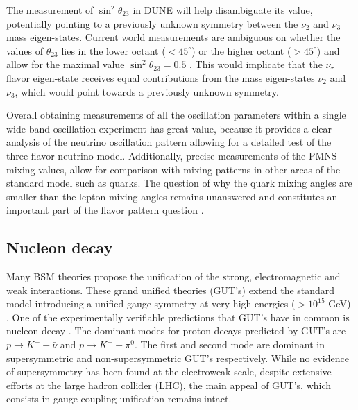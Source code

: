 The measurement of $\sin^2\theta_{23}$ in DUNE will help disambiguate its value, potentially pointing to a previously unknown symmetry between the $\nu_2$ and $\nu_3$ mass eigen-states.  Current world measurements are ambiguous on whether the values of $\theta_\text{23}$ lies in the lower octant ($<45^\circ$) or the higher octant ($>45^\circ$) and allow for the maximal value $\sin^2\theta_{23}=0.5$ \cite{Esteban:2018azc}. This would implicate that the $\nu_\tau$ flavor eigen-state receives equal contributions from the mass eigen-states $\nu_2$ and $\nu_3$, which would point towards a previously unknown symmetry. 

Overall obtaining measurements of all the oscillation parameters within a single wide-band oscillation experiment has great value, because it provides a clear analysis of the neutrino oscillation pattern allowing for a detailed test of the three-flavor neutrino model. Additionally, precise measurements of the PMNS mixing values, allow for comparison with mixing patterns in other areas of the standard model such as quarks. The question of why the quark mixing angles are smaller than the lepton mixing angles remains unanswered and constitutes an important part of the flavor pattern question \cite{King:2014nza}. 


\subsection{Nucleon decay}
\label{Sec:ProtonDecay}
Many BSM theories propose the unification of the strong, electromagnetic and weak interactions. These grand unified theories (GUT's) extend the standard model introducing a unified gauge symmetry at very high energies ($>10^{15}$ GeV) \cite{deBoer:1994dg}. One of the experimentally verifiable predictions that GUT's have in common is nucleon decay \cite{Langacker:1980js}. The dominant modes for proton decays predicted by GUT's are $p\rightarrow K^+ + \bar{\nu}$ and $p\rightarrow K^+ +\pi^0$. The first and second mode are dominant in supersymmetric and non-supersymmetric GUT's respectively. While no evidence of supersymmetry has been found at the electroweak scale, despite extensive efforts at the large hadron collider (LHC), the main appeal of GUT's, which consists in gauge-coupling unification remains intact. 

